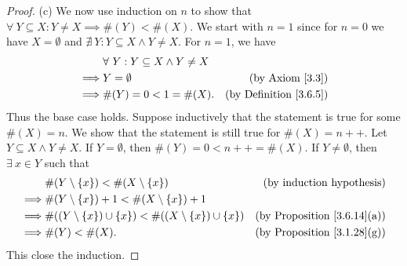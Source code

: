 \begin{proof}{(c)}
    We now use induction on \(n\) to show that \(\forall\ Y \subseteq X : Y \neq X \implies \#(Y) < \#(X)\).
    We start with \(n = 1\) since for \(n = 0\) we have \(X = \emptyset\) and \(\nexists\ Y : Y \subseteq X \land Y \neq X\).
    For \(n = 1\), we have
    \begin{align*}
                 & \forall\ Y : Y \subseteq X \land Y \neq X                                      \\
        \implies & Y = \emptyset                             & \text{(by Axiom \ref{3.3})}        \\
        \implies & \#(Y) = 0 < 1 = \#(X).                    & \text{(by Definition \ref{3.6.5})}
    \end{align*}
    Thus the base case holds.
    Suppose inductively that the statement is true for some \(\#(X) = n\).
    We show that the statement is still true for \(\#(X) = n++\).
    Let \(Y \subseteq X \land Y \neq X\).
    If \(Y = \emptyset\), then \(\#(Y) = 0 < n++ = \#(X)\).
    If \(Y \neq \emptyset\), then \(\exists\ x \in Y\) such that
    \begin{align*}
                 & \#(Y \setminus \{x\}) < \#(X \setminus \{x\})                           & \text{(by induction hypothesis)}        \\
        \implies & \#(Y \setminus \{x\}) + 1 < \#(X \setminus \{x\}) + 1                                                             \\
        \implies & \#((Y \setminus \{x\}) \cup \{x\}) < \#((X \setminus \{x\}) \cup \{x\}) & \text{(by Proposition \ref{3.6.14}(a))} \\
        \implies & \#(Y) < \#(X).                                                          & \text{(by Proposition \ref{3.1.28}(g))}
    \end{align*}
    This close the induction.
\end{proof}

